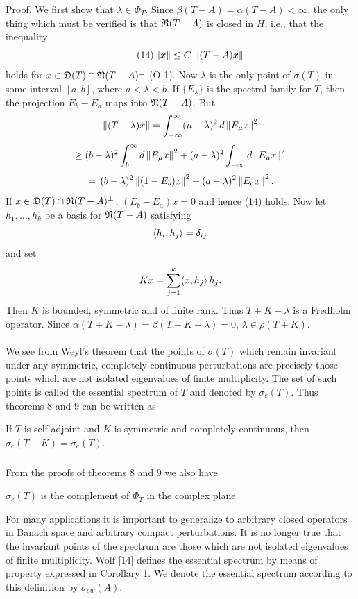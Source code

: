 \documentclass[11pt,twoside]{article}
\begin{document}
Proof.
We first show that $\lambda \in \Phi_T$.
Since $\beta(T-A) = \alpha(T- A) < \infty$,
the only thing which must be verified
is that $\mathfrak{R}(T-A)$ is closed in $H$,
i.e.,
that the inequality
\begin{equation}\tag{14}
\left\lVert x \right\rVert \leq C \, \left\lVert (T-A)x \right\rVert
\end{equation}
holds for $x \in \mathfrak{D}(T) \cap \mathfrak{N}(T-A)^{\bot}$ (O-1).
Now $\lambda$ is the only point of $\sigma(T)$ in some interval $[a,b]$,
where $a < \lambda < b$.
If $\{E_{\lambda}\}$ is the spectral family for $T$,
then the projection $E_b - E_a$ maps into $\mathfrak{N}(T-A)$.
But
\[
\left\lVert (T-\lambda)x \right\rVert
= \int_{-\infty}^{\infty} (\mu-\lambda)^2 \, d\left\lVert E_{\mu}x \right\rVert^2
\]
\[
\geq (b-\lambda)^2 \int_b^{\infty} d\left\lVert E_{\mu}x \right\rVert^2
+    (a-\lambda)^2 \int_{-\infty}  d\left\lVert E_{\mu}x \right\rVert^2
\]
\[
\,=\, (b-\lambda)^2 \left\lVert (1-E_b)x \right\rVert^2 + (a-\lambda)^2 \left\lVert E_a x \right\rVert^2.
\]
If $x \in \mathfrak{D}(T) \cap \mathfrak{N}(T-A)^{\bot}$,
$(E_b - E_a)x = 0$ and hence (14) holds.
Now let $h_1,\ldots,h_k$ be a basis for $\mathfrak{N}(T-A)$ satisfying
\[
\langle h_i,h_j \rangle = \delta_{ij}
\]
and set
\[
Kx = \sum_{j=1}^k \langle x,h_j \rangle \, h_j.
\]
Then $K$ is bounded, symmetric and of finite rank.
Thus $T+K-\lambda$ is a Fredholm operator.
Since $\alpha(T+K-\lambda) = \beta(T+K-\lambda) = 0$,
$\lambda \in \rho(T+K)$.

\paragraph*{}
We see from Weyl's theorem that the points of $\sigma(T)$
which remain invariant under any symmetric, completely continuous
perturbations are precisely those points which are not isolated
eigenvalues of finite multiplicity.
The set of such points is called the essential spectrum of $T$
and denoted by $\sigma_e(T)$.
Thus theorems 8 and 9 can be written as

\begin{theorem1} %
If $T$ is self-adjoint and $K$ is symmetric and completely continuous,
then $\sigma_e(T + K) = \sigma_e(T)$.
\end{theorem1}

\subparagraph*{}
From the proofs of theorems 8 and 9 we also have

\begin{corollary} %
$\sigma_e(T)$ is the complement of $\Phi_T$ in the complex plane.
\end{corollary}

For many applications it is important to generalize to
arbitrary closed operators in Banach space and arbitrary
compact perturbations.
It is no longer true that the invariant points of the spectrum are those
which are not isolated eigenvalues of finite multiplicity.
Wolf [14] defines the essential spectrum
by means of property expressed in Corollary 1.
We denote the essential spectrum according to this definition by
$\sigma_{ew}(A)$.
\end{document}
